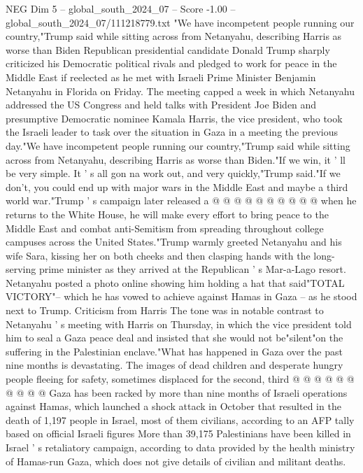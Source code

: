 \begin{textsample}{NEG Dim 5 – global\_south\_2024\_07 – Score -1.00 – global\_south\_2024\_07/111218779.txt}  \label{ex:f5_neg_277}
"We have incompetent people running our country,"Trump said while sitting across from Netanyahu, describing Harris as worse than Biden Republican presidential candidate Donald Trump sharply criticized his Democratic political rivals and pledged to work for peace in the Middle East if reelected as he met with Israeli Prime Minister Benjamin Netanyahu in Florida on Friday.
The meeting capped a week in which Netanyahu addressed the US Congress and held talks with President Joe Biden and presumptive Democratic nominee Kamala Harris, the vice president, who took the Israeli leader to task over the situation in Gaza in a meeting the previous day."We have incompetent people running our country,"Trump said while sitting across from Netanyahu, describing Harris as worse than Biden."If we win, it ' ll be very simple.
It ' s all gon na work out, and very quickly,"Trump said."If we don't, you could end up with major wars in the Middle East and maybe a third world war."Trump ' s campaign later released a @ @ @ @ @ @ @ @ @ @ when he returns to the White House, he will make every effort to bring peace to the Middle East and combat anti-Semitism from spreading throughout college campuses across the United States."Trump warmly greeted Netanyahu and his wife Sara, kissing her on both cheeks and then clasping hands with the long-serving prime minister as they arrived at the Republican ' s Mar-a-Lago resort.
Netanyahu posted a photo online showing him holding a hat that said"TOTAL VICTORY"-- which he has vowed to achieve against Hamas in Gaza -- as he stood next to Trump.
Criticism from Harris The tone was in notable contrast to Netanyahu ' s meeting with Harris on Thursday, in which the vice president told him to seal a Gaza peace deal and insisted that she would not be"silent"on the suffering in the Palestinian enclave."What has happened in Gaza over the past nine months is devastating.
The images of dead children and desperate hungry people fleeing for safety, sometimes displaced for the second, third @ @ @ @ @ @ @ @ @ @ Gaza has been racked by more than nine months of Israeli operations against Hamas, which launched a shock attack in October that resulted in the death of 1,197 people in Israel, most of them civilians, according to an AFP tally based on official Israeli figures More than 39,175 Palestinians have been killed in Israel ' s retaliatory campaign, according to data provided by the health ministry of Hamas-run Gaza, which does not give details of civilian and militant deaths.

\end{textsample}
